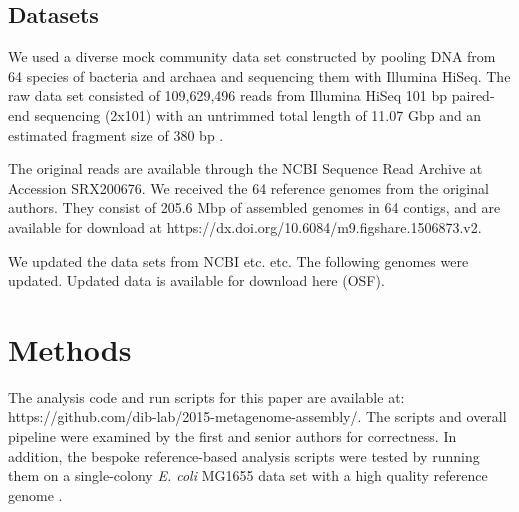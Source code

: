 \documentclass[10pt,a4paper,twocolumn]{article}
\begin{document}


 

\subsection*{Datasets}

We used a diverse mock community data set constructed by pooling DNA
from 64 species of bacteria and archaea and sequencing them with
Illumina HiSeq.  The raw data set consisted of 109,629,496 reads from
Illumina HiSeq 101 bp paired-end sequencing (2x101) with an untrimmed
total length of 11.07 Gbp and an estimated fragment size of 380 bp
\cite{podar}.
 
The original reads are available through the NCBI Sequence Read
Archive at Accession SRX200676.
We received the 64 reference genomes from the original authors. They
consist of 205.6 Mbp of assembled genomes in 64 contigs, and are
available for download at
https://dx.doi.org/10.6084/m9.figshare.1506873.v2.

We updated the data sets from NCBI etc. etc.  The following genomes
were updated.  Updated data is available for download here (OSF).

\section*{Methods}
The analysis code and run scripts for this paper are available at:
https://github.com/dib-lab/2015-metagenome-assembly/. The scripts and
overall pipeline were examined by the first and senior authors for
correctness.  In addition, the bespoke reference-based analysis
scripts were tested by running them on a single-colony {\em E. coli} MG1655
data set with a high quality reference genome \cite{chitsaz2011}.
\end{document}
